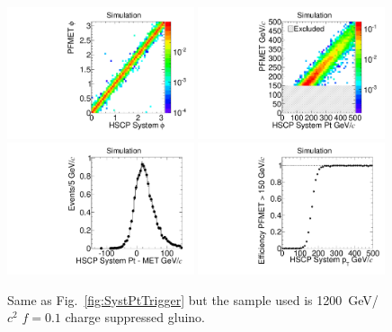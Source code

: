 \begin{figure}
  \begin{center}
      \includegraphics[clip=false, trim=0.0cm 0cm 0.0cm 0cm, width=0.49\textwidth]{figures/search/Gluino_8TeV_M1200N_f10SystPhiMET}
      \includegraphics[clip=false, trim=0.0cm 0cm 0.0cm 0cm, width=0.49\textwidth]{figures/search/Gluino_8TeV_M1200N_f10SystPtMET} \\
      \includegraphics[clip=false, trim=0.0cm 0cm 0.0cm 0cm, width=0.49\textwidth]{figures/search/Gluino_8TeV_M1200N_f10SystPtDiffMET}
      \includegraphics[clip=false, trim=0.0cm 0cm 0.0cm 0cm, width=0.49\textwidth]{figures/search/Gluino_8TeV_M1200N_f10SystPtEff}
      \caption[Comparison of di-HSCP system $\phi$ and \pt\ with PFMET for a 1200~GeV/$c^2$
gluino $f=0.1$ charge suppressed sample in events with at least 150~GeV/$c$ of PFMET]
      {Same as Fig.~\ref{fig:SystPtTrigger} but the sample used is 1200~GeV/$c^2$ $f=0.1$ charge suppressed gluino.
        }
      \label{fig:SystPtTriggerN}
  \end{center}
\end{figure}

